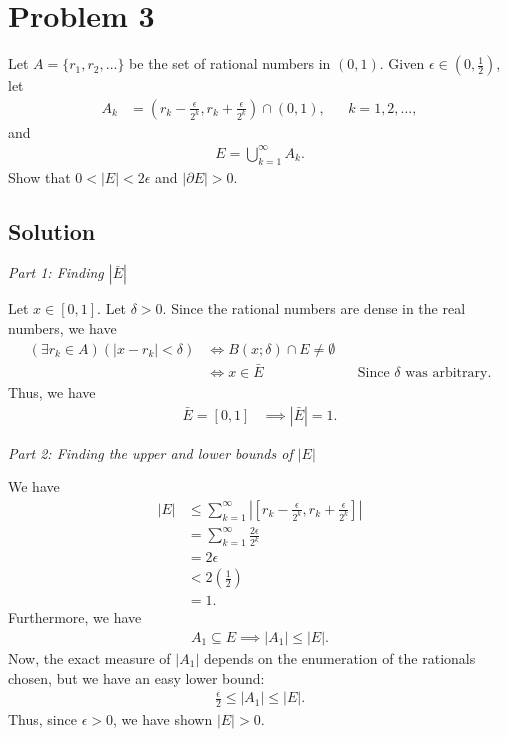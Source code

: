 \documentclass[10pt,a4paper]{article}
\makeatletter
\theoremstyle{theorem}
\newcommand{\proofpart}[2]{%
  \par
  \addvspace{\medskipamount}%
  \noindent\emph{Part #1: #2}\par\nobreak
  \addvspace{\smallskipamount}%
  \@afterheading
}
\theoremstyle{definition}
\makeatother
\begin{document}
\section*{Problem 3}
Let $A = \{r_1, r_2, ...\}$ be the set of rational numbers in $(0, 1)$. Given $\epsilon \in (0, \frac{1}{2})$, let 
\begin{align*}
A_k &= (r_k - \frac{\epsilon}{2^k}, r_k + \frac{\epsilon}{2^k}) \cap (0, 1), &&k=1,2,\ldots,
\end{align*} 
and 
\begin{align*}
E = \bigcup_{k=1}^\infty A_k.
\end{align*}
Show that $0 < |E| < 2 \epsilon$ and $|\partial E| > 0$.

\subsection*{Solution}
\proofpart{1}{Finding $|\bar{E}|$}
Let $x \in [0, 1]$. Let $\delta > 0$. Since the rational numbers are dense in the real numbers, we have 
\begin{align*}
(\exists r_k \in A)(|x - r_k| < \delta) &\iff B(x; \delta) \cap E \not= \emptyset\\
&\iff x \in \bar{E} && \text{Since }\delta \text{ was arbitrary}.
\end{align*}
Thus, we have
\begin{align*}
\bar{E} = [0, 1] &\implies |\bar{E}| = 1.
\end{align*} 

\proofpart{2}{Finding the upper and lower bounds of $|E|$}
We have
\begin{align*}
|E| &\leq \sum_{k=1}^\infty |[r_k - \frac{\epsilon}{2^k}, r_k + \frac{\epsilon}{2^k}]|\\
&= \sum_{k=1}^\infty \frac{2 \epsilon}{2^k}\\
&= 2 \epsilon\\
&< 2 \left(\frac{1}{2}\right)\\
&= 1.
\end{align*}
Furthermore, we have
\begin{align*}
A_1 \subseteq E \implies |A_1| \leq |E|.
\end{align*}
Now, the exact measure of $|A_1|$ depends on the enumeration of the rationals chosen, but we have an easy lower bound:
\begin{align*}
\frac{\epsilon}{2} \leq |A_1| \leq |E|.
\end{align*}
Thus, since $\epsilon > 0$, we have shown $|E| > 0$.
\end{document}
